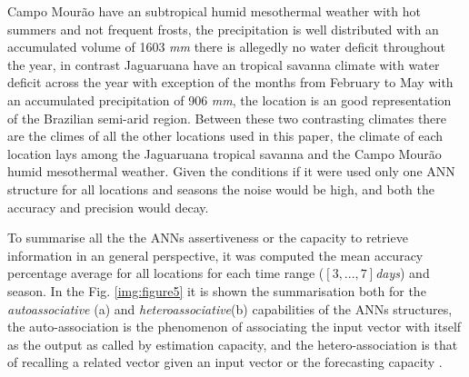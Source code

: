 Campo Mourão have an subtropical humid mesothermal weather with hot summers and not frequent frosts, the precipitation is well distributed with an accumulated volume of 1603 \textit{mm} there is allegedly no water deficit throughout the year, in contrast Jaguaruana have an tropical savanna climate with water deficit across the year with exception of the months from February to May with an accumulated precipitation of 906 \textit{mm}, the location is an  good representation of the Brazilian semi-arid region. Between these two contrasting climates there are the climes of all the other locations used in this paper, the climate of each location lays among the Jaguaruana tropical savanna and the Campo Mourão humid mesothermal weather. Given the conditions if it were used only one ANN structure for all locations and seasons the noise would be high, and both the accuracy and precision would decay. 

To summarise all the the ANNs assertiveness or the capacity to retrieve information in an general perspective, it was computed the mean accuracy percentage average for all locations for each time range ($[3,...,7]$\textit{days}) and season. In the Fig. \ref{img:figure5} it is shown the summarisation both for the \textit{autoassociative} (a) and \textit{heteroassociative}(b) capabilities of the ANNs structures, the auto-association is the phenomenon of associating the input vector with itself as the output as called by estimation capacity, and the hetero-association is that of recalling a related vector given an input vector or the forecasting capacity \cite{rao1995c++}. 


